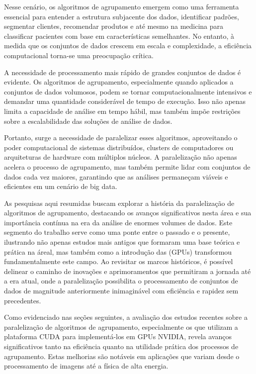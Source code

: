 \documentclass[12pt,
openright, 
oneside, %
a4paper,    %
brazil]{facom-ufu-abntex2}
\begin{document}
Nesse cenário, os algoritmos de agrupamento emergem como uma ferramenta essencial para entender a estrutura subjacente dos dados, identificar padrões, segmentar clientes, recomendar produtos e até mesmo na medicina para classificar pacientes com base em características semelhantes. No entanto, à medida que os conjuntos de dados crescem em escala e complexidade, a eficiência computacional torna-se uma preocupação crítica.

A necessidade de processamento mais rápido de grandes conjuntos de dados é evidente. Os algoritmos de agrupamento, especialmente quando aplicados a conjuntos de dados volumosos, podem se tornar computacionalmente intensivos e demandar uma quantidade considerável de tempo de execução. Isso não apenas limita a capacidade de análise em tempo hábil, mas também impõe restrições sobre a escalabilidade das soluções de análise de dados.

Portanto, surge a necessidade de paralelizar esses algoritmos, aproveitando o poder computacional de sistemas distribuídos, clusters de computadores ou arquiteturas de hardware com múltiplos núcleos. A paralelização não apenas acelera o processo de agrupamento, mas também permite lidar com conjuntos de dados cada vez maiores, garantindo que as análises permaneçam viáveis e eficientes em um cenário de big data.

As pesquisas aqui resumidas buscam explorar a história da paralelização de algoritmos de agrupamento, destacando os avanços significativos nesta área e sua importância contínua na era da análise de enormes volumes de dados. Este segmento do trabalho serve como uma ponte entre o passado e o presente, ilustrando não apenas estudos mais antigos que formaram uma base teórica e prática na áreal, mas também como a introdução das (GPUs) transformou fundamentalmente este campo. Ao revisitar os marcos históricos, é possível delinear o caminho de inovações e aprimoramentos que permitiram a jornada até a era atual, onde a paralelização possibilita o processamento de conjuntos de dados de magnitude anteriormente inimaginável com eficiência e rapidez sem precedentes.


Como evidenciado nas seções seguintes, a avaliação dos estudos recentes sobre a paralelização de algoritmos de agrupamento, especialmente os que utilizam a plataforma CUDA para implementá-los em GPUs NVIDIA, revela avanços significativos tanto na eficiência quanto na utilidade prática dos processos de agrupamento. Estas melhorias são notáveis em aplicações que variam desde o processamento de imagens até a física de alta energia.
\end{document}
